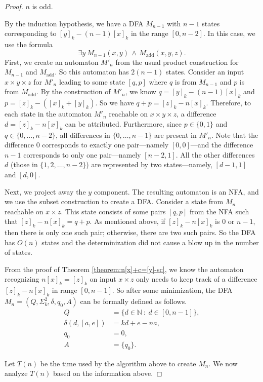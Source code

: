 \documentclass[10pt,a4paper]{amsart}
\def\AND{\, \wedge \,}
\def\add{\text{add}}
\def\suchthat{\ : \ }
\begin{document}
\begin{proof}
\bigskip{} $n$ is odd.

By the induction hypothesis, we have a DFA $M_{n-1}$ with $n-1$ states corresponding to $[y]_k - (n-1)[x]_k$ in the range $[0, n-2]$.
In this case, we use the formula
$$ \exists y \ M_{n-1}(x,y) \AND M_{\add}(x, y, z).$$
First, we create an automaton $M'_{n}$ from the usual product construction for $M_{n-1}$ and $M_{\add}$. So this automaton has $2(n-1) $ states. Consider an input $x \times y \times z$ for $M'_{n}$ leading to some state $[q, p]$ where $q$ is from $M_{n-1}$ and $p$ is from $M_{\add}$. By the construction of $M'_{n}$, we know $q=[y]_k - (n-1)[x]_k$ and $p=[z]_k - ([x]_k + [y]_k)$. So we have $q+p = [z]_k - n[x]_k$. Therefore, to each state in the automaton $M'_{n}$ reachable on $x \times y \times z$, a difference $d=[z]_k - n[x]_k$ can be attributed. Furthermore, since $p \in \{0, 1\}$ and $q \in \{0, \ldots, n-2\}$, all differences in $\{0, \ldots, n-1\}$ are present in $M'_{n}$. Note that the difference $0$ corresponds to exactly one pair---namely $[0,0]$---and the difference $n-1$ corresponds to only one pair---namely $[n-2,1]$.
All the other differences $d$ (those in $\{ 1,2,\ldots, n-2\}$)  are represented by two states---namely, $[d-1,1]$ and $[d,0]$.

Next, we project away the $y$ component.  The resulting automaton is an NFA, and we use the subset construction to create a DFA.  Consider a state from $M_{n}$ reachable on $x \times z$. This state consists of some pairs $[q, p]$ from the NFA such that $[z]_k - n[x]_k = q+p$. As mentioned above, if $[z]_k-n[x]_k$ is $0$ or $n-1$, then there is only one such pair; otherwise, there are two such pairs.
 So the DFA has $O(n)$ states and the determinization did not cause a blow up in the number of states.

From the proof of Theorem \ref{theorem:n[x]+c=[y]-sc}, we know the automaton recognizing $n[x]_k= [z]_k$ on input $x \times z$ only needs to keep track of a difference $[z]_k - n[x]_k$ in range $[0, n-1]$. So after some minimization, the DFA  $M_{n}=(Q, \Sigma^2_k, \delta, q_0, A)$ can be formally defined as follows.
\begin{align*}
Q &= \{ d \in \mathbb{N}  \suchthat d \in [0, n-1] \}, \\
\delta(d, [a, e]) &= kd + e - na,
 \\
q_0 &= 0, \\
A &= \{q_0\}.
\end{align*}

Let $T(n)$ be the time used by the algorithm above to create $M_n$. We now analyze $T(n)$ based on the information above.


\end{proof}
\end{document}
